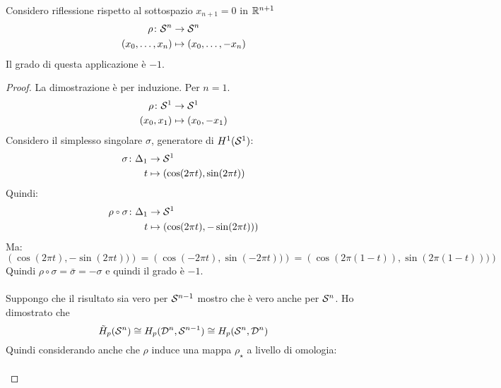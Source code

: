 \begin{proposition}
  Considero riflessione rispetto al sottospazio $ x_{n+1} = 0 $ in $ \mathbb{R}^{n+1} $
  \begin{align*}
    \rho \colon \mathcal{S}^{n} & \to \mathcal{S}^{n} \\
    (x_0, \dots, x_{n}) & \mapsto (x_0, \dots, - x_{n})
  \end{align*}
  Il grado di questa applicazione è $ - 1 $.
\end{proposition}
\begin{proof}
  La dimostrazione è per induzione.
  Per $ n = 1 $.
  \begin{align*}
    \rho \colon \mathcal{S}^{1} & \to \mathcal{S}^{1} \\
    (x_0,x_1) & \mapsto (x_0, -x_1)
  \end{align*}
  Considero il simplesso singolare $ \sigma $, generatore di $ H^1(\mathcal{S}^{1}) $:
  \begin{align*}
    \sigma \colon \Delta_1 & \to \mathcal{S}^{1} \\
    t & \mapsto \left(\cos(2 \pi t), \sin(2 \pi t)\right)
  \end{align*}
  Quindi:
  \begin{align*}
    \rho \circ \sigma \colon \Delta_1 & \to \Sph{1} \\
    t & \mapsto \left(\cos(2 \pi t), -\sin(2 \pi t))\right)
  \end{align*}
  Ma:
  \[
    \left(\cos(2 \pi t), -\sin(2 \pi t))\right) = \left(\cos(-2 \pi t), \sin(-2 \pi t))\right) = \left(\cos(2 \pi (1-t)), \sin(2 \pi (1-t)))\right)
  \]
  Quindi $ \rho \circ \sigma = \bar{\sigma} = - \sigma $ e quindi il grado è $ - 1 $.
  \\ \\ \noindent
  Suppongo che il risultato sia vero per $ \mathcal{S}^{n-1} $ mostro che è vero anche per $ \mathcal{S}^{n} $.
  Ho dimostrato che
  \[
    \tilde{H}_p(\mathcal{S}^{n}) \cong H_p(\mathcal{D}^{n}, \mathcal{S}^{n-1}) \cong H_p(\mathcal{S}^{n}, \mathcal{D}^{n})
  \]
  Quindi considerando anche che $ \rho $ induce una mappa $ \rho_\star $ a livello di omologia:
  \[
    \begin{tikzcd}

\end{tikzcd}\]
\end{proof}

